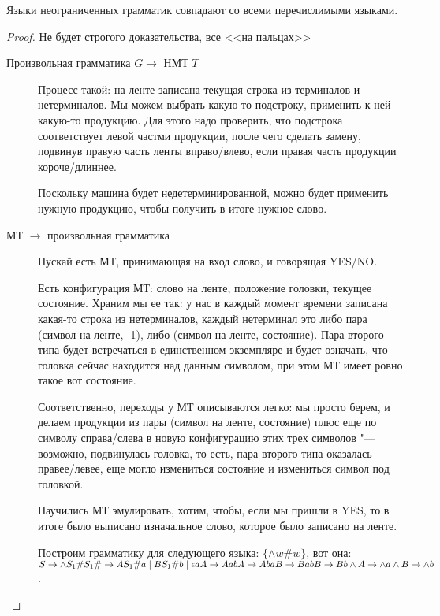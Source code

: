 \begin{theorem}
Языки неограниченных грамматик совпадают со всеми перечислимыми языками.
\end{theorem}
\begin{proof}
Не будет строгого доказательства, все <<на пальцах>>
\begin{description}
\item[Произвольная грамматика $G \to$ НМТ $T$]
Процесс такой: на ленте записана текущая строка из терминалов и нетерминалов. Мы можем выбрать какую-то подстроку, применить к ней какую-то продукцию.
Для этого надо проверить, что подстрока соответствует левой частми продукции, после чего сделать замену, подвинув правую часть ленты вправо/влево, если правая часть продукции короче/длиннее.

Поскольку машина будет недетерминированной, можно будет применить нужную продукцию, чтобы получить в итоге нужное слово.

\item[МТ $\to$ произвольная грамматика]
Пускай есть МТ, принимающая на вход слово, и говорящая YES/NO. 

Есть конфигурация МТ: слово на ленте, положение головки, текущее состояние. 
Храним мы ее так: у нас в каждый момент времени записана какая-то строка из нетерминалов, каждый нетерминал это либо пара (символ на ленте, -1), либо (символ на ленте, состояние).
Пара второго типа будет встречаться в единственном экземпляре и будет означать, что головка сейчас находится над данным символом, при этом МТ имеет ровно такое вот состояние.

Соответственно, переходы у МТ описываются легко: мы просто берем, и делаем продукции из пары (символ на ленте, состояние) плюс еще по символу справа/слева в новую конфигурацию этих трех символов "---
возможно, подвинулась головка, то есть, пара второго типа оказалась правее/левее, еще могло измениться состояние и измениться символ под головкой.

Научились МТ эмулировать, хотим, чтобы, если мы пришли в YES, то в итоге было выписано изначальное слово, которое было записано на ленте.
                                                
Построим грамматику для следующего языка: $\{\wedge w\#w\}$, вот она:
$\\
S \to \wedge S_1\# \\
S_1\# \to AS_1\#a \mid BS_1\#b \mid \epsilon \\
aA \to Aa \\
bA \to Ab \\
aB \to Ba \\
bB \to Bb \\
\wedge A \to \wedge a \\
\wedge B \to \wedge b$.


\end{description}
\end{proof}
